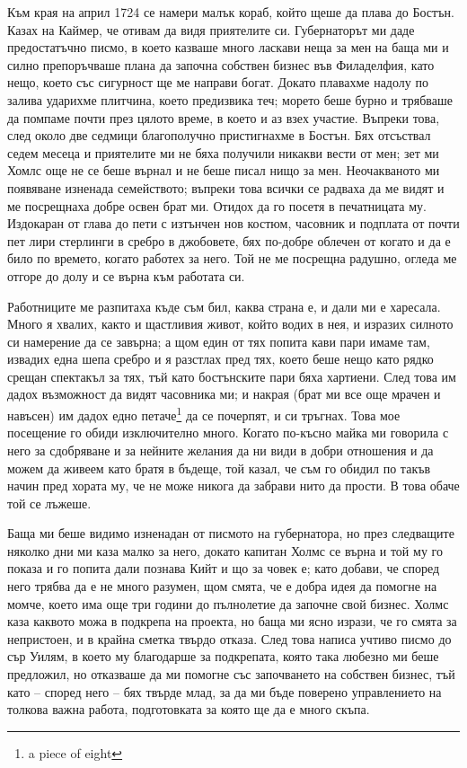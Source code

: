 \documentclass[12pt]{book}
\begin{document}
Към края на април 1724 се намери малък кораб, който щеше да плава до Бостън. Казах на Каймер, че отивам да видя приятелите си. Губернаторът ми даде предостатъчно писмо, в което казваше много ласкави неща за мен на баща ми и силно препоръчваше плана да започна собствен бизнес във Филаделфия, като нещо, което със сигурност ще ме направи богат. Докато плавахме надолу по залива ударихме плитчина, което предизвика теч; морето беше бурно и трябваше да помпаме почти през цялото време, в което и аз взех участие. Въпреки това, след около две седмици благополучно пристигнахме в Бостън. Бях отсъствал седем месеца и приятелите ми не бяха получили никакви вести от мен; зет ми Хомлс още не се беше върнал и не беше писал нищо за мен. Неочакваното ми появяване изненада семейството; въпреки това всички се радваха да ме видят и ме посрещнаха добре освен брат ми. Отидох да го посетя в печатницата му. Издокаран от глава до пети с изтънчен нов костюм, часовник и подплата от почти пет лири стерлинги в сребро в джобовете, бях по-добре облечен от когато и да е било по времето, когато работех за него. Той не ме посрещна радушно, огледа ме отгоре до долу и се върна към работата си.

Работниците ме разпитаха къде съм бил, каква страна е, и дали ми е харесала. Много я хвалих, както и щастливия живот, който водих в нея, и изразих силното си намерение да се завърна; а щом един от тях попита кави пари имаме там, извадих една шепа сребро и я разстлах пред тях, което беше нещо като рядко срещан спектакъл за тях, тъй като бостънските пари бяха хартиени. След това им дадох възможност да видят часовника ми; и накрая (брат ми все още мрачен и навъсен) им дадох едно петаче\footnote{a piece of eight} да се почерпят, и си тръгнах. Това мое посещение го обиди изключително много. Когато по-късно майка ми говорила с него за сдобряване и за нейните желания да ни види в добри отношения и да можем да живеем като братя в бъдеще, той казал, че съм го обидил по такъв начин пред хората му, че не може никога да забрави нито да прости. В това обаче той се лъжеше.

Баща ми беше видимо изненадан от писмото на губернатора, но през следващите няколко дни ми каза малко за него, докато капитан Холмс се върна и той му го показа и го попита дали познава Кийт и що за човек е; като добави, че според него трябва да е не много разумен, щом смята, че е добра идея да помогне на момче, което има още три години до пълнолетие да започне свой бизнес. Холмс каза каквото можа в подкрепа на проекта, но баща ми ясно изрази, че го смята за непристоен, и в крайна сметка твърдо отказа. След това написа учтиво писмо до сър Уилям, в което му благодарше  за подкрепата, която така любезно ми беше предложил, но отказваше да ми помогне със започването на собствен бизнес, тъй като – според него – бях твърде млад, за да ми бъде поверено управлението на толкова важна работа, подготовката за която ще да е много скъпа. 
\end{document}
